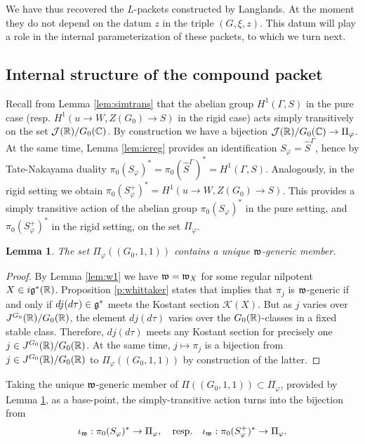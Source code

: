 \documentclass{article}
\newtheorem{lem}[thm]{Lemma}
\theoremstyle{definition}
\numberwithin{equation}{section}
\renewcommand{\-}{\hyp{}}
\newcommand{\K}{\mathcal K}
\begin{document}
We have thus recovered the $L$\-packets constructed by Langlands. At the moment they do not depend on the datum $z$ in the triple $(G,\xi,z)$. This datum will play a role in the internal parameterization of these packets, to which we turn next.

\subsection{Internal structure of the compound packet} \label{sub:intstr}


Recall from Lemma \ref{lem:simtrans} that the abelian group $H^1(\Gamma,S)$ in the pure case (resp. $H^1(u \to W,Z(G_0) \to S)$ in the rigid case) acts simply transitively on the set $\mathcal{J}(\mathbb{R})/G_0(\mathbb{C})$. By construction we have a bijection $\mathcal{J}(\mathbb{R})/G_0(\mathbb{C}) \to \Pi_\varphi$. At the same time, Lemma \ref{lem:icreg} provides an identification $S_\varphi = \hat S^\Gamma$, hence by Tate-Nakayama duality $\pi_0(S_\varphi)^*=\pi_0(\hat S^\Gamma)^*=H^1(\Gamma,S)$. Analogously, in the rigid setting we obtain $\pi_0(S_\varphi^+)^*=H^1(u \to W,Z(G_0) \to S)$. This provides a simply transitive action of the abelian group $\pi_0(S_\varphi)^*$ in the pure setting, and $\pi_0(S_\varphi^+)^*$ in the rigid setting, on the set $\Pi_\varphi$.

\begin{lem} \label{lem:uniqgen}
The set $\Pi_\varphi((G_0,1,1))$ contains a unique $\mathfrak{w}$-generic member.
\end{lem}
\begin{proof}
By Lemma \ref{lem:w1} we have $\mathfrak{w}=\mathfrak{w}_X$ for some regular nilpotent $X \in i\mathfrak{g}^*(\mathbb{R})$. Proposition \ref{p:whittaker} states that implies that $\pi_j$ is $\mathfrak{w}$-generic if and only if $dj(d\tau) \in \mathfrak{g}^*$ meets the  Kostant section $\K(X)$. But as $j$ varies over $J^{G_0}(\mathbb{R})/G_0(\mathbb{R})$, the element $dj(d\tau)$ varies over the $G_0(\mathbb{R})$-classes in a fixed stable class. Therefore, $dj(d\tau)$ meets any Kostant section for precisely one $j \in J^{G_0}(\mathbb{R})/G_0(\mathbb{R})$. At the same time, $j \mapsto \pi_j$ is a bijection from $j \in J^{G_0}(\mathbb{R})/G_0(\mathbb{R})$ to $\Pi_\varphi((G_0,1,1))$ by construction of the latter.
\end{proof}

Taking the unique $\mathfrak{w}$-generic member of $\Pi((G_0,1,1)) \subset \Pi_\varphi$, provided by Lemma \ref{lem:uniqgen}, as a base-point, the simply-transitive action turns into the bijection from 
\[ \iota_{\mathfrak{w}} : \pi_0(S_\varphi)^* \to  \Pi_\varphi, \quad \textrm{resp.}\quad \iota_{\mathfrak{w}} : \pi_0(S_\varphi^+)^* \to \Pi_\varphi. \]
\end{document}
